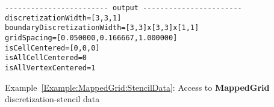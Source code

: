 \documentclass{article}
\begin{document}
{\small
{}
\begin{verbatim}
------------------------ output -----------------------
discretizationWidth=[3,3,1]
boundaryDiscretizationWidth=[3,3]x[3,3]x[1,1]
gridSpacing=[0.050000,0.166667,1.000000]
isCellCentered=[0,0,0]
isAllCellCentered=0
isAllVertexCentered=1
\end{verbatim}
}
{\center Example~\ref{Example:MappedGrid:StencilData}: Access to \textbf{MappedGrid} discretization-stencil data\label{Example:MappedGrid:StencilData}}



\end{document}
